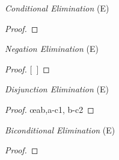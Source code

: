 \documentclass[a4paper, 11pt]{article} %
\begin{document}
\begin{multicols}{2}
	\textit{Conditional Elimination} (\eif E)
	\begin{proof}
		 
	\end{proof}
	\medskip

	\textit{Negation Elimination} (\enot E)
	\begin{proof}
		\open
		 
		\ellipsesline
		\metaB
		\close
		[\ ]\metaA{}
	\end{proof}
	\medskip

	\textit{Disjunction Elimination} (\eor E)
	\begin{proof}
		\open
		 
		\close
		\open
		 
		\close
		 \oe{ab,a-c1, b-c2}
	\end{proof}
	\medskip

	\textit{Biconditional Elimination} (\eiff E)
	\begin{proof}
		 
	\end{proof}
	\medskip

\end{multicols}
\end{document}
